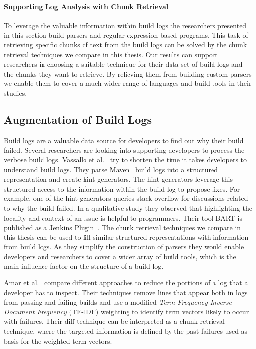 \documentclass[\myrootdir/main.tex]{subfiles}
\begin{document}
\paragraph{Supporting Log Analysis with Chunk Retrieval}
To leverage the valuable information within build logs the researchers presented in this section build parsers and regular expression-based programs.
This task of retrieving specific chunks of text from the build logs can be solved by the chunk retrieval techniques we compare in this thesis.
Our results can support researchers in choosing a suitable technique for their data set of build logs and the chunks they want to retrieve.
By relieving them from building custom parsers we enable them to cover a much wider range of languages and build tools in their studies.

\subsection{Augmentation of Build Logs}
\label{sec:rw-bl-analysis}
Build logs are a valuable data source for developers to find out why their build failed.
Several researchers are looking into supporting developers to process the verbose build logs.
Vassallo et al.~\cite{vassallo2018un-break} try to shorten the time it takes developers to understand build logs.
They parse Maven~\cite{maven2019website} build logs into a structured representation and create hint generators.
The hint generators leverage this structured access to the information within the build log to propose fixes.
For example, one of the hint generators queries stack overflow for discussions related to why the build failed.
In a qualitative study they observed that highlighting the locality and context of an issue is helpful to programmers.
Their tool BART is published as a Jenkins Plugin~\cite{bart2019plugin}.
The chunk retrieval techniques we compare in this thesis can be used to fill similar structured representations with information from build logs.
As they simplify the construction of parsers they would enable developers and researchers to cover a wider array of build tools, which is the main influence factor on the structure of a build log.

Amar et al.~\cite{amar2019mining} compare different approaches to reduce the portions of a log that a developer has to inspect.
Their techniques remove lines that appear both in logs from passing and failing builds and use a modified \emph{Term Frequency Inverse Document Frequency} (TF-IDF) weighting to identify term vectors likely to occur with failures.
Their diff technique can be interpreted as a chunk retrieval technique, where the targeted information is defined by the past failures used as basis for the weighted term vectors.
\end{document}
